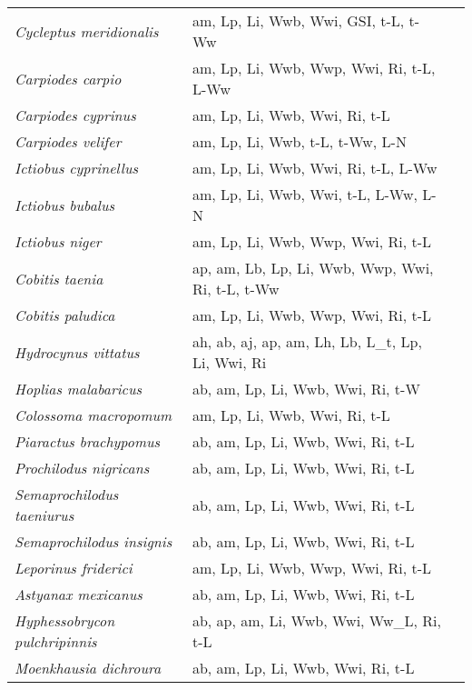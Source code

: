 {\begin{longtable}[c]{p{3.5cm}p{5.5cm}p{5.5cm}}
\emph{Cycleptus meridionalis} &  am, Lp, Li, Wwb, Wwi, GSI, t-L, t-Ww & \citet{PeteNich1999} \\
\emph{Carpiodes carpio} &  am, Lp, Li, Wwb, Wwp, Wwi, Ri, t-L, L-Ww & \citet{Morr1965} \\
\emph{Carpiodes cyprinus} &  am, Lp, Li, Wwb, Wwi, Ri, t-L & \citet{GrabYoun2012} \\
\emph{Carpiodes velifer} &  am, Lp, Li, Wwb, t-L, t-Ww, L-N & \citet{WoodWiss1976} \\
\emph{Ictiobus cyprinellus} &  am, Lp, Li, Wwb, Wwi, Ri, t-L, L-Ww & \citet{John1959} \\
\emph{Ictiobus bubalus} &  am, Lp, Li, Wwb, Wwi, t-L, L-Ww, L-N & \citet{Jest1973} \\
\emph{Ictiobus niger} &  am, Lp, Li, Wwb, Wwp, Wwi, Ri, t-L &  \\
\emph{Cobitis taenia} &  ap, am, Lb, Lp, Li, Wwb, Wwp, Wwi, Ri, t-L, t-Ww & \citet{Robo1981} \\
\emph{Cobitis paludica} &  am, Lp, Li, Wwb, Wwp, Wwi, Ri, t-L & \citet{OlivTorr2002} \\
\emph{Hydrocynus vittatus} &  ah, ab, aj, ap, am, Lh, Lb, L\_t, Lp, Li, Wwi, Ri & \citet{SteyGagi1996} \\
\emph{Hoplias malabaricus} &  ab, am, Lp, Li, Wwb, Wwi, Ri, t-W & \citet{DaniFari2019} \\
\emph{Colossoma macropomum} &  am, Lp, Li, Wwb, Wwi, Ri, t-L & \citet{CostBart2013} \\
\emph{Piaractus brachypomus} &  ab, am, Lp, Li, Wwb, Wwi, Ri, t-L & \citet{GuerAmad2018} \\
\emph{Prochilodus nigricans} &  ab, am, Lp, Li, Wwb, Wwi, Ri, t-L & \citet{GuerAmad2018} \\
\emph{Semaprochilodus taeniurus} &  ab, am, Lp, Li, Wwb, Wwi, Ri, t-L & \citet{GuerAmad2018} \\
\emph{Semaprochilodus insignis} &  ab, am, Lp, Li, Wwb, Wwi, Ri, t-L & \citet{GuerAmad2018} \\
\emph{Leporinus friderici} &  am, Lp, Li, Wwb, Wwp, Wwi, Ri, t-L & \citet{GosmPire2015,BoujLeco1991} \\
\emph{Astyanax mexicanus} &  ab, am, Lp, Li, Wwb, Wwi, Ri, t-L & \citet{SimoElle2017} \\
\emph{Hyphessobrycon pulchripinnis} &  ab, ap, am, Li, Wwb, Wwi, Ww\_L, Ri, t-L & \citet{ColeKoto1999} \\
\emph{Moenkhausia dichroura} &  ab, am, Lp, Li, Wwb, Wwi, Ri, t-L & \citet{CunhCate2007} \\

\end{longtable}}

